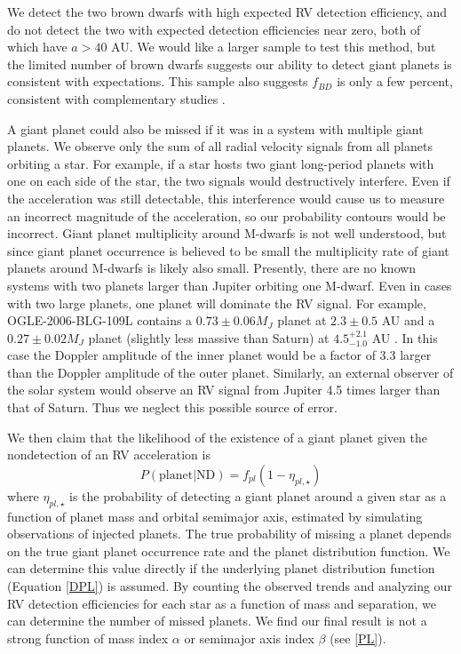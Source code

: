 We detect the two brown dwarfs with high expected RV detection efficiency, and do not detect the two with expected detection efficiencies near zero, both of which have $a > 40$ AU. We would like a larger sample to test this method, but the limited number of brown dwarfs suggests our ability to detect giant planets is consistent with expectations. This sample also suggests $f_{BD}$ is only a few percent, consistent with complementary studies \citep{Dieterich12}.


A giant planet could also be missed if it was in a system with multiple giant planets. We observe only the sum of all radial velocity signals from all planets orbiting a star. For example, if a star hosts two giant long-period planets with one on each side of the star, the two signals would destructively interfere. Even if the acceleration was still detectable, this interference would cause us to measure an incorrect magnitude of the acceleration, so our probability contours would be incorrect. Giant planet multiplicity around M-dwarfs is not well understood, but since giant planet occurrence is believed to be small \citep{Bonfils13} the multiplicity rate of giant planets around M-dwarfs is likely also small. Presently, there are no known systems with two planets larger than Jupiter orbiting one M-dwarf. Even in cases with two large planets, one planet will dominate the RV signal. For example, OGLE-2006-BLG-109L contains a $0.73 \pm 0.06 M_J$ planet at $2.3 \pm 0.5$ AU and a $0.27 \pm 0.02 M_J$ planet (slightly less massive than Saturn) at $4.5^{+2.1}_{-1.0}$ AU \citep{Gaudi08, Bennett10}. In this case the Doppler amplitude of the inner planet would be a factor of 3.3 larger than the Doppler amplitude of the outer planet. Similarly, an external observer of the solar system would observe an RV signal from Jupiter 4.5 times larger than that of Saturn. Thus we neglect this possible source of error.


We then claim that the likelihood of the existence of a giant planet given the nondetection of an RV acceleration is 
\begin{equation}
P(\mbox{planet}|\mbox{ND}) = f_{pl}(1-\eta_{pl,\star})
\label{FNP} 
\end{equation}
where $\eta_{pl, \star}$ is the probability of detecting a giant planet around a given star as a function of planet mass and orbital semimajor axis, estimated by simulating observations of injected planets. The true probability of missing a planet depends on the true giant planet occurrence rate and the planet distribution function. We can determine this value directly if the underlying planet distribution function (Equation \ref{DPL}) is assumed. By counting the observed trends and analyzing our RV detection efficiencies for each star as a function of mass and separation, we can determine the number of missed planets. We find our final result is not a strong function of mass index $\alpha$ or semimajor axis index $\beta$ (see \textsection\ref{PL}).

